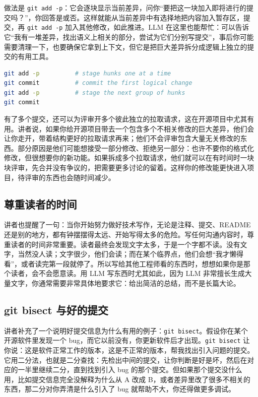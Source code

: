 \documentclass[a4paper]{article}
\begin{document}
做法是 \texttt{git add -p}：它会逐块显示当前差异，问你“要把这一块加入即将进行的提交吗？”，你回答是或否。这样就能从当前差异中有选择地把内容加入暂存区，提交，再 \texttt{git add -p} 加入其他修改，如此推进。LLM 在这里也能帮忙：可以告诉它“我有一堆差异，找出语义上相关的部分，尝试为它们分别写提交”，事后你可能需要清理一下，也要确保它拿到上下文，但它是把巨大差异拆分成逻辑上独立的提交的有用工具。

\begin{lstlisting}[language=bash]
git add -p          # stage hunks one at a time
git commit          # commit the first logical change
git add -p          # stage the next group of hunks
git commit
\end{lstlisting}

有了多个提交，还可以为评审开多个彼此独立的拉取请求，这在开源项目中尤其有用。讲者说，如果你给开源项目带去一个包含多个不相关修改的巨大差异，他们会让你走开，带着结构更好的拉取请求再来；他们不会评审包含大量无关修改的东西。部分原因是他们可能想接受一部分修改、拒绝另一部分：也许不要你的格式化修改，但很想要你的新功能。如果拆成多个拉取请求，他们就可以在有时间时一块块评审，先合并没有争议的，把需要更多讨论的留着。这样你的修改能更快进入项目，待评审的东西也会随时间减少。

\subsection{尊重读者的时间}

讲者也提醒了一句：当你开始努力做好技术写作，无论是注释、提交、README 还是别的地方，都有钟摆摆得太远、开始写得太多的危险。写任何沟通内容时，尊重读者的时间非常重要。读者最终会发现文字太多，于是一个字都不读。没有文字，当然没人读；文字很少，他们会读；而在某个临界点，他们会想“我才懒得看”，或者读完第一段就停了。所以写给其他工程师看的东西时，想想如果你是那个读者，会不会愿意读。用 LLM 写东西时尤其如此，因为 LLM 非常擅长生成大量文字，你通常需要非常具体地要求它：给出简洁的总结，而不是长篇大论。

\subsection{git bisect 与好的提交}

讲者补充了一个说明好提交信息为什么有用的例子：\texttt{git bisect}。假设你在某个开源软件里发现一个 bug，而它以前没有，你更新软件后才出现。\texttt{git bisect} 让你说：这是软件正常工作的版本，这是不正常的版本，帮我找出引入问题的提交。它用二分法，也就是二分查找：先检出中间的提交，让你判断是好是坏，然后在对应的一半里继续二分，直到找到引入 bug 的那个提交。但如果那个提交没什么用，比如提交信息完全没解释为什么从 A 改成 B，或者差异里改了很多不相关的东西，那二分对你弄清是什么引入了 bug 就帮助不大，你还得做更多调试。
\end{document}
